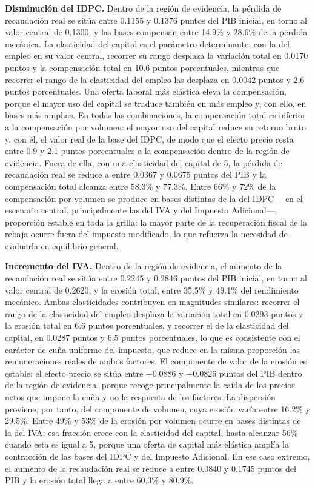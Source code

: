 \documentclass[11pt]{article}
\begin{document}
\textbf{Disminución del IDPC.} Dentro de la región de evidencia, la pérdida de recaudación real se sitúa entre 0.1155 y 0.1376 puntos del PIB inicial, en torno al valor central de 0.1300, y las bases compensan entre 14.9\% y 28.6\% de la pérdida mecánica. La elasticidad del capital es el parámetro determinante: con la del empleo en su valor central, recorrer su rango desplaza la variación total en 0.0170 puntos y la compensación total en 10.6 puntos porcentuales, mientras que recorrer el rango de la elasticidad del empleo las desplaza en 0.0042 puntos y 2.6 puntos porcentuales. Una oferta laboral más elástica eleva la compensación, porque el mayor uso del capital se traduce también en más empleo y, con ello, en bases más amplias. En todas las combinaciones, la compensación total es inferior a la compensación por volumen: el mayor uso del capital reduce su retorno bruto y, con él, el valor real de la base del IDPC, de modo que el efecto precio resta entre 0.9 y 2.1 puntos porcentuales a la compensación dentro de la región de evidencia. Fuera de ella, con una elasticidad del capital de 5, la pérdida de recaudación real se reduce a entre 0.0367 y 0.0675 puntos del PIB y la compensación total alcanza entre 58.3\% y 77.3\%. Entre 66\% y 72\% de la compensación por volumen se produce en bases distintas de la del IDPC ---en el escenario central, principalmente las del IVA y del Impuesto Adicional---, proporción estable en toda la grilla: la mayor parte de la recuperación fiscal de la rebaja ocurre fuera del impuesto modificado, lo que refuerza la necesidad de evaluarla en equilibrio general.

\textbf{Incremento del IVA.} Dentro de la región de evidencia, el aumento de la recaudación real se sitúa entre 0.2245 y 0.2846 puntos del PIB inicial, en torno al valor central de 0.2620, y la erosión total, entre 35.5\% y 49.1\% del rendimiento mecánico. Ambas elasticidades contribuyen en magnitudes similares: recorrer el rango de la elasticidad del empleo desplaza la variación total en 0.0293 puntos y la erosión total en 6.6 puntos porcentuales, y recorrer el de la elasticidad del capital, en 0.0287 puntos y 6.5 puntos porcentuales, lo que es consistente con el carácter de cuña uniforme del impuesto, que reduce en la misma proporción las remuneraciones reales de ambos factores. El componente de valor de la erosión es estable: el efecto precio se sitúa entre $-0.0886$ y $-0.0826$ puntos del PIB dentro de la región de evidencia, porque recoge principalmente la caída de los precios netos que impone la cuña y no la respuesta de los factores. La dispersión proviene, por tanto, del componente de volumen, cuya erosión varía entre 16.2\% y 29.5\%. Entre 49\% y 53\% de la erosión por volumen ocurre en bases distintas de la del IVA; esa fracción crece con la elasticidad del capital, hasta alcanzar 56\% cuando esta es igual a 5, porque una oferta de capital más elástica amplía la contracción de las bases del IDPC y del Impuesto Adicional. En ese caso extremo, el aumento de la recaudación real se reduce a entre 0.0840 y 0.1745 puntos del PIB y la erosión total llega a entre 60.3\% y 80.9\%.
\end{document}
